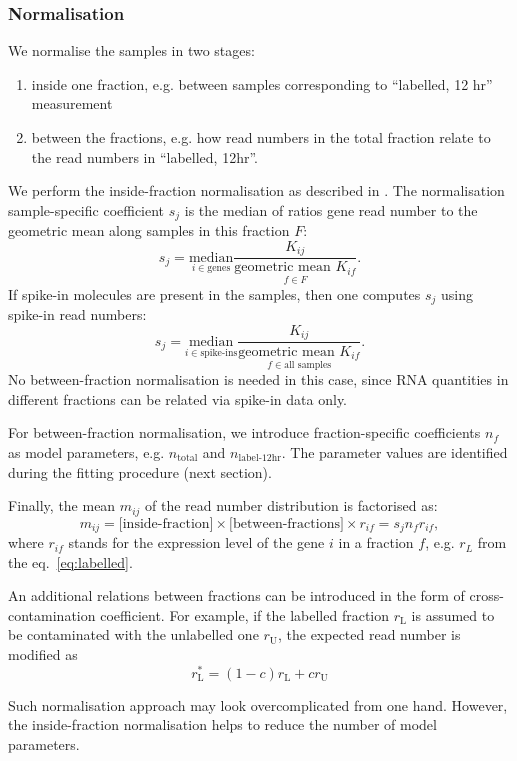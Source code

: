 \subsubsection{Normalisation}
\label{subsec:normalisation}		
We normalise the samples in two stages:
\begin{enumerate}
\item inside one fraction,
e.g. between samples corresponding to ``labelled, 12 hr'' measurement
\item between the fractions, 
e.g. how read numbers in the total fraction relate to the read numbers in 
``labelled, 12hr''.
\end{enumerate}
We perform the inside-fraction  normalisation as described in 
\citep{anders2010differential}. The normalisation sample-specific 
coefficient $s_j$ is the median of ratios gene read number to the geometric mean
along samples in this fraction $F$:
\begin{equation}
 s_j = \underset{i\in \text{genes}}{\mathrm{median}}
 \frac{K_{ij}}{\underset{f \in F}{\text{geometric mean }K_{if}}}.
\end{equation}
If spike-in molecules are present in the samples, then one computes $s_{j}$ 
using spike-in read numbers: 
\begin{equation}
 s_j = \underset{i \in \text{spike-ins}}{\mathrm{median}}
 \frac{K_{ij}}{\underset{f \in \text{all samples}}{\text{geometric mean }K_{if}}}.
\end{equation}
No between-fraction normalisation is needed in this case, since RNA quantities
in different fractions can be related via spike-in data only.
\par
For between-fraction normalisation, we introduce fraction-specific 
coefficients $n_f$ as model parameters, 
e.g. $n_\text{total}$ and $n_\text{label-12hr}$. The parameter values are identified
during the fitting procedure (next section).
\par
Finally, the mean $m_{ij}$ of the read number distribution is factorised as:
\begin{equation}
 m_{ij} = \text{[inside-fraction]}\times\text{[between-fractions]}\times
 r_{if} = s_jn_fr_{if},
 \end{equation}
where $r_{if}$ stands for the expression level of the gene $i$ in a fraction $f$, e.g.
$r_L$ from the eq.~\ref{eq:labelled}. 
\par
An additional relations between fractions can be introduced in the form 
of cross-contamination coefficient. For example,
if the labelled fraction $r_\text{L}$ is assumed to be 
contaminated with the unlabelled one $r_\text{U}$,
the expected read number is modified as
\begin{equation}
  r^*_\text{L} = (1-c)r_\text{L} + cr_\text{U}
 \end{equation}
\par  Such normalisation approach may look overcomplicated 
from one hand. However, the inside-fraction normalisation helps to reduce the number
of model parameters. 
